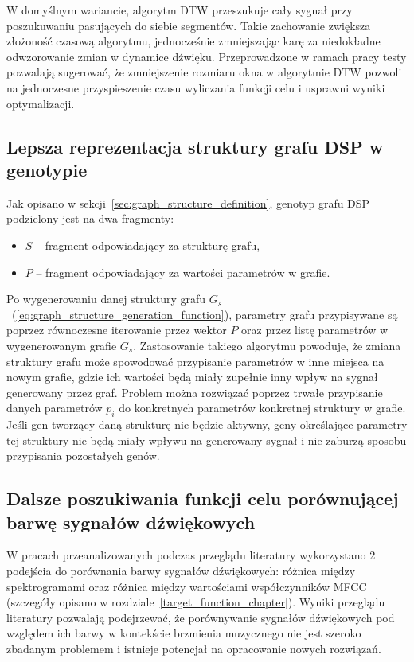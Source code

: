 W domyślnym wariancie, algorytm DTW przeszukuje cały sygnał
przy poszukuwaniu pasujących do siebie segmentów. Takie
zachowanie zwiększa złożoność czasową algorytmu, jednocześnie
zmniejszając karę za niedokładne odwzorowanie zmian w dynamice dźwięku.
Przeprowadzone w ramach pracy testy pozwalają sugerować, że zmniejszenie
rozmiaru okna w algorytmie DTW pozwoli na jednoczesne przyspieszenie czasu
wyliczania funkcji celu i usprawni wyniki optymalizacji.

\subsection{Lepsza reprezentacja struktury grafu DSP w genotypie}

Jak opisano w sekcji~\ref{sec:graph_structure_definition}, genotyp grafu DSP
podzielony jest na dwa fragmenty:

\begin{itemize}
  \item $S$ -- fragment odpowiadający za strukturę grafu,
  \item $P$ -- fragment odpowiadający za wartości parametrów w grafie.
\end{itemize}

Po wygenerowaniu danej struktury grafu $G_s$~(\ref{eq:graph_structure_generation_function}),
parametry grafu przypisywane są poprzez równoczesne iterowanie przez wektor $P$ oraz
przez listę parametrów w wygenerowanym grafie $G_s$. Zastosowanie takiego algorytmu
powoduje, że zmiana struktury grafu może spowodować przypisanie parametrów w inne miejsca
na nowym grafie, gdzie ich wartości będą miały zupełnie inny wpływ na sygnał
generowany przez graf. Problem można rozwiązać poprzez trwałe przypisanie danych
parametrów $p_i$ do konkretnych parametrów konkretnej struktury w grafie. Jeśli gen 
tworzący daną strukturę nie będzie aktywny, geny określające parametry tej struktury nie będą
miały wpływu na generowany sygnał i nie zaburzą sposobu przypisania pozostałych genów.


\subsection{Dalsze poszukiwania funkcji celu porównującej barwę sygnałów dźwiękowych}

W pracach przeanalizowanych podczas przeglądu literatury wykorzystano 2 podejścia
do porównania barwy sygnałów dźwiękowych: różnica między spektrogramami oraz
różnica między wartościami współczynników MFCC
(szczegóły opisano w rozdziale~\ref{target_function_chapter}).
Wyniki przeglądu literatury pozwalają podejrzewać, że porównywanie sygnałów
dźwiękowych pod względem ich barwy w kontekście brzmienia muzycznego
nie jest szeroko zbadanym problemem i istnieje potencjał na opracowanie
nowych rozwiązań.


